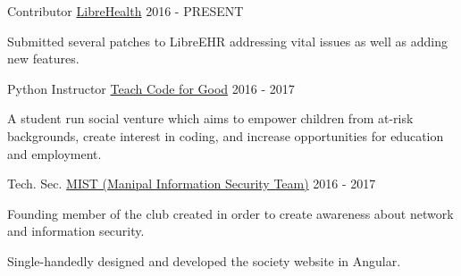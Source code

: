 

\begin{cventries}

  \cventry
    {Contributor} %
    {\href{http://librehealth.io}{LibreHealth}} %
    {} %
    {2016 - PRESENT} %
    {
      \begin{cvitems} %
        \item {Submitted several patches to LibreEHR addressing vital issues as well as adding new features.}
      \end{cvitems}
    }

  \cventry
    {Python Instructor} %
    {\href{http://www.resolutionproject.org/ventures/teach-code-good}{Teach Code for Good}} %
    {} %
    {2016 - 2017} %
    {
      \begin{cvitems} %
        \item {A student run social venture which aims to empower children from at-risk backgrounds, create interest in coding, and increase opportunities for education and employment.}
      \end{cvitems}
    }

  \cventry
    {Tech. Sec.} %
    {\href{http://wearemist.in}{MIST (Manipal Information Security Team)}} %
    {} %
    {2016 - 2017} %
    {
      \begin{cvitems} %
      	\item {Founding member of the club created in order to create awareness about network and information security.}
        \item {Single-handedly designed and developed the society website in Angular.}
      \end{cvitems}
    }

\end{cventries}
